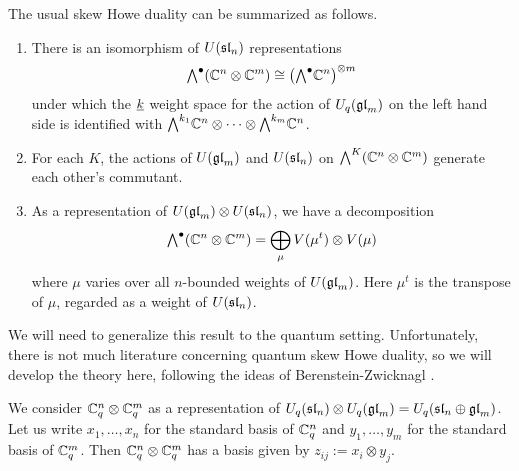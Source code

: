 \documentclass[11pt]{amsart}
\begin{document}
\begin{thm}\mbox{}
The usual skew Howe duality can be summarized as follows.
\begin{enumerate}
\item There is an isomorphism of $ U(\sl_n) $ representations 
\begin{equation}
 \Alt{\bullet}{}(\mathbb C^n \otimes \mathbb C^m) \cong \left( \Alt{\bullet}{} \bC^n \right)^{\otimes m}
 \end{equation}
under which the $ \ul{k} $ weight space for the action of $ U_q(\gl_m) $ on the left hand side is identified with $\Alt{k_1}{} \mathbb C^n \otimes \cdots \otimes \Alt{k_m}{} \mathbb C^n$.
\item For each $ K $, the actions of $ U(\gl_m) $ and $ U(\sl_n) $ on $ \Alt{K}{}(\bC^n \otimes \bC^m) $ generate each other's commutant.
\item As a representation of $ U(\gl_m) \otimes U(\sl_n)$, we have a decomposition
$$ \Alt{\bullet}{} (\mathbb C^n \otimes \mathbb C^m) = \bigoplus_{\mu} V(\mu^t) \otimes V(\mu) $$
where $\mu$ varies over all $n$-bounded weights of $U(\gl_m)$. Here $\mu^t$ is the transpose of $\mu$, regarded as a weight of $U(\sl_n)$.
\end{enumerate}
\end{thm}

We will need to generalize this result to the quantum setting.  Unfortunately, there is not much literature concerning quantum skew Howe duality, so we will develop the theory here, following the ideas of Berenstein-Zwicknagl \cite{BZ}.  

We consider $ \bC^n_q \otimes \bC^m_q $ as a representation of $U_q(\sl_n) \otimes U_q(\gl_m) = U_q(\sl_n \oplus \gl_m) $. Let us write $ x_1, \dots, x_n $ for the standard basis of $ \bC_q^n $ and $ y_1, \dots, y_m $ for the standard basis of $ \bC_q^m $.  Then $ \bC_q^n \otimes \bC_q^m $ has a basis given by $ z_{ij} := x_i \otimes y_j $.
\end{document}
